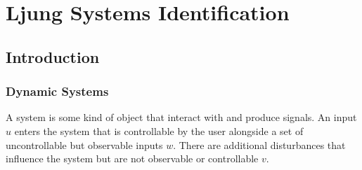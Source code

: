 \section{Ljung Systems Identification}
\subsection{Introduction}
\subsubsection{Dynamic Systems}
A system is some kind of object that interact with and produce signals.
An input $u$ enters the system that is controllable by the user alongside a set of uncontrollable but observable inputs $w$.
There are additional disturbances that influence the system but are not observable or controllable $v$.
